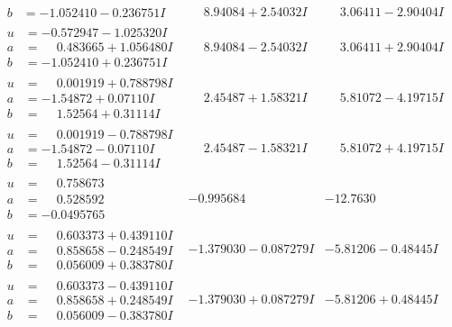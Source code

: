 \documentclass[1p]{elsarticle_modified}
\theoremstyle{definition}
\begin{document}
$$\begin{array}{c|c|c}
\begin{aligned}
b &= -1.052410 - 0.236751 I\end{aligned}
 & \phantom{-}8.94084 + 2.54032 I & \phantom{-}3.06411 - 2.90404 I \\ \hline\begin{aligned}
u &= -0.572947 - 1.025320 I \\
a &= \phantom{-}0.483665 + 1.056480 I \\
b &= -1.052410 + 0.236751 I\end{aligned}
 & \phantom{-}8.94084 - 2.54032 I & \phantom{-}3.06411 + 2.90404 I \\ \hline\begin{aligned}
u &= \phantom{-}0.001919 + 0.788798 I \\
a &= -1.54872 + 0.07110 I \\
b &= \phantom{-}1.52564 + 0.31114 I\end{aligned}
 & \phantom{-}2.45487 + 1.58321 I & \phantom{-}5.81072 - 4.19715 I \\ \hline\begin{aligned}
u &= \phantom{-}0.001919 - 0.788798 I \\
a &= -1.54872 - 0.07110 I \\
b &= \phantom{-}1.52564 - 0.31114 I\end{aligned}
 & \phantom{-}2.45487 - 1.58321 I & \phantom{-}5.81072 + 4.19715 I \\ \hline\begin{aligned}
u &= \phantom{-}0.758673\phantom{ +0.000000I} \\
a &= \phantom{-}0.528592\phantom{ +0.000000I} \\
b &= -0.0495765\phantom{ +0.000000I}\end{aligned}
 & -0.995684\phantom{ +0.000000I} & -12.7630\phantom{ +0.000000I} \\ \hline\begin{aligned}
u &= \phantom{-}0.603373 + 0.439110 I \\
a &= \phantom{-}0.858658 - 0.248549 I \\
b &= \phantom{-}0.056009 + 0.383780 I\end{aligned}
 & -1.379030 - 0.087279 I & -5.81206 - 0.48445 I \\ \hline\begin{aligned}
u &= \phantom{-}0.603373 - 0.439110 I \\
a &= \phantom{-}0.858658 + 0.248549 I \\
b &= \phantom{-}0.056009 - 0.383780 I\end{aligned}
 & -1.379030 + 0.087279 I & -5.81206 + 0.48445 I \\ \hline\begin{aligned}

\end{aligned}
\end{array}$$
\end{document}
